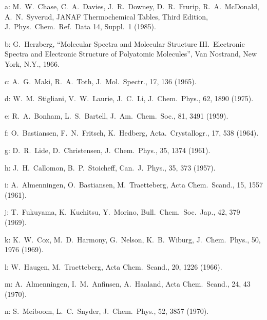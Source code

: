 \begin{description}
\item{   a: } M.\ W.\ Chase, C.\ A.\ Davies, J.\ R.\ Downey, D.\ R.\ Frurip, R.\ A.\ McDonald,
       A.\ N.\ Syverud, JANAF Thermochemical Tables, Third Edition,
       J.\ Phys.\ Chem.\ Ref.\ Data 14, Suppl.\ 1 (1985).
  
\item{   b: } G.\ Herzberg, ``Molecular Spectra and Molecular Structure III.\ Electronic
       Spectra and Electronic Structure of Polyatomic Molecules'',
       Van Nostrand, New York, N.Y., 1966.
  
\item{   c: } A.\ G.\ Maki, R.\ A.\ Toth, J.\ Mol.\ Spectr., 17, 136 (1965).
  
\item{   d: } W.\ M.\ Stigliani, V.\ W.\ Laurie, J.\ C.\ Li, J.\ Chem.\ Phys., 62, 1890 (1975).
  
\item{   e: } R.\ A.\ Bonham, L.\ S.\ Bartell, J.\ Am.\ Chem.\ Soc., 81, 3491 (1959).
  
\item{   f: } O.\ Bastiansen, F.\ N.\ Fritsch, K.\ Hedberg, Acta.\ Crystallogr., 17, 538
       (1964).
  
\item{   g: } D.\ R.\ Lide, D.\ Christensen, J.\ Chem.\ Phys., 35, 1374 (1961).
  
\item{   h: } J.\ H.\ Callomon, B.\ P.\ Stoicheff, Can.\ J.\ Phys., 35, 373 (1957).
  
\item{   i: } A.\ Almenningen, O.\ Bastiansen, M.\ Traetteberg, Acta Chem.\ Scand., 15, 1557
       (1961).
  
\item{   j: } T.\ Fukuyama, K.\ Kuchitsu, Y.\ Morino, Bull.\ Chem.\ Soc.\ Jap., 42, 379 (1969).
  
\item{   k: } K.\ W.\ Cox, M.\ D.\ Harmony, G.\ Nelson, K.\ B.\ Wiburg, J.\ Chem.\ Phys., 50,
       1976 (1969).
  
\item{   l: } W.\ Haugen, M.\ Traetteberg, Acta Chem.\ Scand., 20, 1226 (1966).
  
\item{   m: } A.\ Almenningen, I.\ M.\ Anfinsen, A.\ Haaland, Acta Chem.\ Scand., 24, 43
       (1970).
  
\item{   n: } S.\ Meiboom, L.\ C.\ Snyder, J.\ Chem.\ Phys., 52, 3857 (1970).
  

\end{description}

